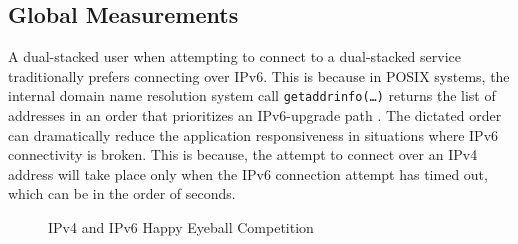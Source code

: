 \subsection{Global Measurements}

A dual-stacked user when attempting to connect to a dual-stacked service
traditionally prefers connecting over IPv6. This is because in POSIX systems,
the internal domain name resolution system call \texttt{getaddrinfo(\ldots)}
\cite{rfc3493} returns the list of addresses in an order that prioritizes an
IPv6-upgrade path \cite{rfc6724}. The dictated order can dramatically reduce
the application responsiveness in situations where IPv6 connectivity is
broken. This is because, the attempt to connect over an IPv4 address will take
place only when the IPv6 connection attempt has timed out, which can be in the
order of seconds.

\begin{figure}
  \begin{minipage}[h]{0.50\textwidth}
    \centering
  \end{minipage}
  \begin{minipage}[h]{0.50\textwidth}
    \centering
  \end{minipage}
\caption{\label{fig:happy-v4-v6-compete}IPv4 and IPv6 Happy Eyeball Competition}
\end{figure}

